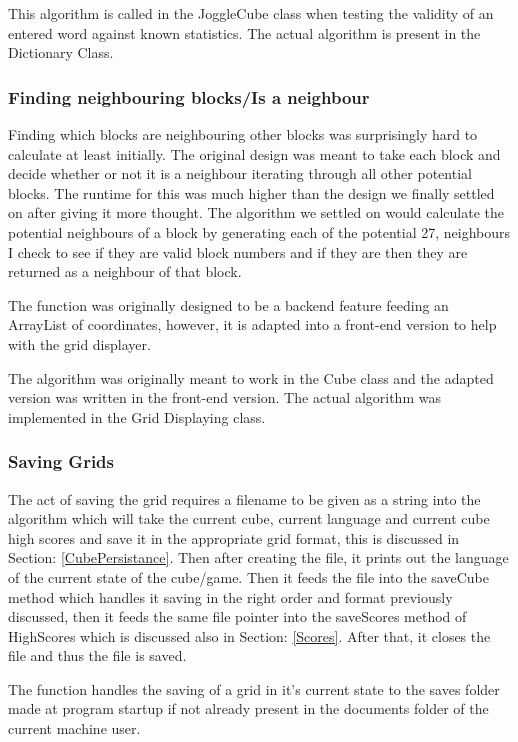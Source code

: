     This algorithm is called in the JoggleCube class when testing the validity of an entered word against known statistics. The actual algorithm is present in the Dictionary Class.
    \subsubsection{Finding neighbouring blocks/Is a neighbour}
    Finding which blocks are neighbouring other blocks was surprisingly hard to calculate at least initially. The original design was meant to take each block and decide whether or not it is a neighbour iterating through all other potential blocks. The runtime for this was much higher than the design we finally settled on after giving it more thought. The algorithm we settled on would calculate the potential neighbours of a block by generating each of the potential 27, neighbours I check to see if they are valid block numbers and if they are then they are returned as a neighbour of that block.
    
    The function was originally designed to be a backend feature feeding an ArrayList of coordinates, however, it is adapted into a front-end version to help with the grid displayer.
    
    The algorithm was originally meant to work in the Cube class and the adapted version was written in the front-end version. The actual algorithm was implemented in the Grid Displaying class.
    \subsubsection{Saving Grids} \label{SaveGrid}
    The act of saving the grid requires a filename to be given as a string into the algorithm which will take the current cube, current language and current cube high scores and save it in the appropriate grid format, this is discussed in Section: \ref{CubePersistance}. Then after creating the file, it prints out the language of the current state of the cube/game. Then it feeds the file into the saveCube method which handles it saving in the right order and format previously discussed, then it feeds the same file pointer into the saveScores method of HighScores which is discussed also in Section: \ref{Scores}. After that, it closes the file and thus the file is saved.
    
    The function handles the saving of a grid in it's current state to the saves folder made at program startup if not already present in the documents folder of the current machine user.
    
